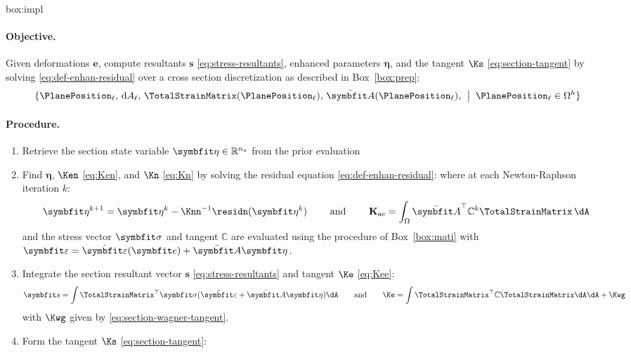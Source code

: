\begin{ambox}{box:impl}
\paragraph{Objective.}
Given deformations \(\bm{e}\), compute resultants \(\bm{s}\) \eqref{eq:stress-resultants}, enhanced parameters \(\bm{\eta}\), and the tangent \(\Ks\) \eqref{eq:section-tangent}
by solving \eqref{eq:def-enhan-residual}
over a cross section discretization as described in Box~\ref{box:prep}:
\[\{\PlanePosition_{\ell},\, \dd A_{\ell}, \, 
\TotalStrainMatrix(\PlanePosition_{\ell}),\, 
\EnhanShapes(\PlanePosition_{\ell}),\,
\; \bigm| \; 
\PlanePosition_{\ell} \in \Section^h
\}
\]

\paragraph{Procedure.}
\begin{enumerate}
    \item Retrieve the section state variable \(\bm{\EnhanParam} \in \mathbb{R}^{n_a}\) from the prior evaluation
    \item Find \(\bm{\eta}\), \(\Ken\) \eqref{eq:Ken}, and \(\Kn\) \eqref{eq:Kn} by solving the residual equation \eqref{eq:def-enhan-residual}:
    where at each Newton-Raphson iteration \(k\):
    \[
     \bm{\EnhanParam}^{k+1} = \bm{\EnhanParam}^{k} - \Knn^{-1} \residn (\bm{\EnhanParam}^{k})
    \qquad\text{ and }\qquad
    \Kae = \int_{\Section} \EnhanShapes^{\top} \mathbb{C}^k \TotalStrainMatrix\, \dA
    \]
    and the stress vector \(\StressVector\) and tangent \(\mathbb{C}\) are evaluated using the procedure of Box~\ref{box:mati} with \(\StrainVector = \hat{\StrainVector}(\bm{e}) + \EnhanShapes \bm{\EnhanParam}\).


    \item Integrate the section resultant vector \(\bm{s}\) \eqref{eq:stress-resultants} and tangent \(\Ke\) \eqref{eq:Kee}:
    \[
    \bm{s} = \int \TotalStrainMatrix^{\top} \bm{\sigma}(\hat{\bm{\varepsilon}} + \EnhanShapes \bm{\EnhanParam}) \dA
    \qquad\text{and}\qquad
    \Ke = \int \TotalStrainMatrix^{\top}\mathbb{C}\TotalStrainMatrix \dA \dA + \Kwg 
    \]
    with \(\Kwg\) given by \eqref{eq:section-wagner-tangent}.

    \item Form the tangent \(\Ks\) \eqref{eq:section-tangent}:
\end{enumerate}
\end{ambox}


